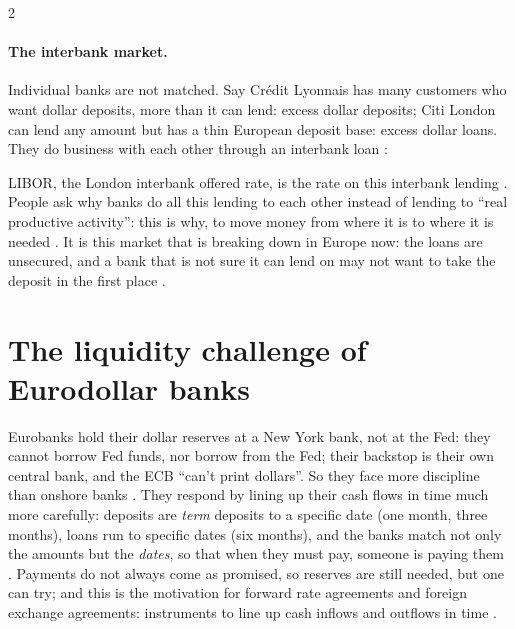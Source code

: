 \begin{paracol}{2}
\paragraph{The interbank market.} Individual banks are not matched. Say Crédit Lyonnais has many customers who want dollar deposits, more than it can lend: excess dollar
deposits; Citi London can lend any amount but has a thin European deposit base: excess dollar loans. They do business with each other through an interbank loan
:
\begin{taccts}
\qquad
{}
\end{taccts}
LIBOR, the London interbank offered rate, is the rate on this interbank lending . People ask why banks do all this lending to each other instead of
lending to ``real productive activity'': this is why, to move money from where it is to where it is needed . It is this market that is breaking down
in Europe now: the loans are unsecured, and a bank that is not sure it can lend on may not want to take the deposit in the first place .

\section{The liquidity challenge of Eurodollar banks}\label{sec:ed-liquidity}

Eurobanks hold their dollar reserves at a New York bank, not at the Fed: they cannot borrow Fed funds, nor borrow from the Fed; their backstop is their own central bank, and the
ECB ``can't print dollars''. So they face more discipline than onshore banks . They respond by lining up their cash flows in time much
more carefully: deposits are \emph{term} deposits to a specific date (one month, three months), loans run to specific dates (six months), and the banks match not only the
amounts but the \emph{dates}, so that when they must pay, someone is paying them . Payments do not always come as promised,
so reserves are still needed, but one can try; and this is the motivation for forward rate agreements and foreign exchange agreements: instruments to line up cash inflows and
outflows in time .


\end{paracol}
